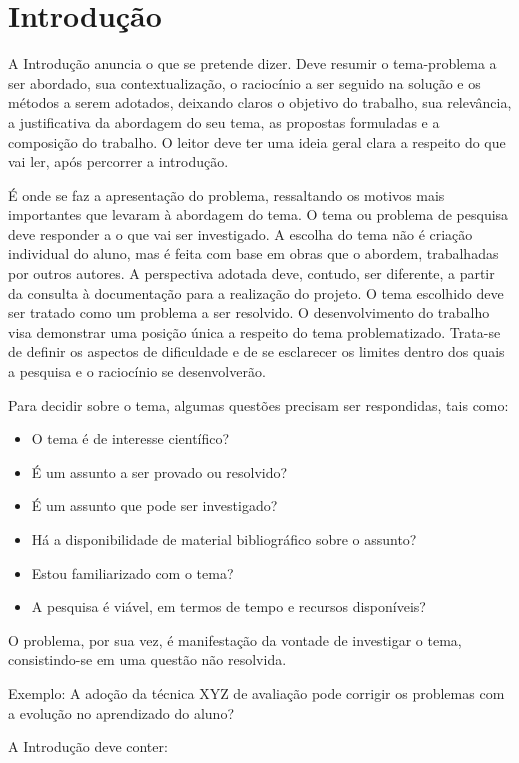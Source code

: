 \chapter{Introdução}
A Introdução anuncia o que se pretende dizer. Deve resumir o tema-problema a ser abordado, sua contextualização, o raciocínio a ser seguido na solução e os métodos a serem adotados, deixando claros o objetivo do trabalho, sua relevância, a justificativa da abordagem do seu tema, as propostas formuladas e a composição do trabalho. O leitor
deve ter uma ideia geral clara a respeito do que vai ler, após percorrer a introdução. 

É onde se faz a apresentação do problema, ressaltando os motivos mais importantes que levaram à abordagem do tema. O tema ou problema de pesquisa deve responder a o que vai ser investigado. A escolha do tema não é criação individual do aluno, mas é feita com base em obras que o abordem, trabalhadas por outros autores. A perspectiva adotada deve, contudo, ser diferente, a partir da consulta à documentação para a realização do projeto. O tema escolhido deve ser tratado como um problema a ser resolvido. O desenvolvimento do trabalho visa demonstrar uma posição única a respeito do tema problematizado. Trata-se de definir os aspectos de dificuldade e de se esclarecer os limites dentro dos quais a pesquisa e o raciocínio se desenvolverão.

Para decidir sobre o tema, algumas questões precisam ser respondidas, tais como:

\begin{itemize}
\item O tema é de interesse científico?
\item É um assunto a ser provado ou resolvido?
\item É um assunto que pode ser investigado?
\item Há a disponibilidade de material bibliográfico sobre o assunto?
\item Estou familiarizado com o tema?
\item A pesquisa é viável, em termos de tempo e recursos disponíveis?
\end{itemize}

O problema, por sua vez, é manifestação da vontade de investigar o tema, consistindo-se em uma questão não resolvida.

Exemplo: A adoção da técnica XYZ de avaliação pode corrigir os problemas com a evolução no aprendizado do aluno?

A Introdução deve conter:

